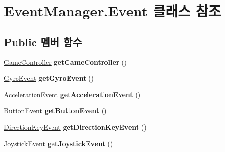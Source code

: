 \hypertarget{class_event_manager_1_1_event}{}\section{Event\+Manager.\+Event 클래스 참조}
\label{class_event_manager_1_1_event}
\subsection*{Public 멤버 함수}
\begin{DoxyCompactItemize}
\item 
\hypertarget{class_event_manager_1_1_event_a9d51b34eef1234efc07ee484d68747ef}{}\hyperlink{class_game_controller}{Game\+Controller} {\bfseries get\+Game\+Controller} ()\label{class_event_manager_1_1_event_a9d51b34eef1234efc07ee484d68747ef}

\item 
\hypertarget{class_event_manager_1_1_event_afbf072b1da0d9e1823b72358fac58737}{}\hyperlink{class_event_manager_1_1_gyro_event}{Gyro\+Event} {\bfseries get\+Gyro\+Event} ()\label{class_event_manager_1_1_event_afbf072b1da0d9e1823b72358fac58737}

\item 
\hypertarget{class_event_manager_1_1_event_ae298c4a24ed673ca9a97c7d254089e7d}{}\hyperlink{class_event_manager_1_1_acceleration_event}{Acceleration\+Event} {\bfseries get\+Acceleration\+Event} ()\label{class_event_manager_1_1_event_ae298c4a24ed673ca9a97c7d254089e7d}

\item 
\hypertarget{class_event_manager_1_1_event_ae41c50157988cb2e2fc03dfced1cdbb0}{}\hyperlink{class_event_manager_1_1_button_event}{Button\+Event} {\bfseries get\+Button\+Event} ()\label{class_event_manager_1_1_event_ae41c50157988cb2e2fc03dfced1cdbb0}

\item 
\hypertarget{class_event_manager_1_1_event_a5b2c2ccfd92ccad4c0637cfd9667867a}{}\hyperlink{class_event_manager_1_1_direction_key_event}{Direction\+Key\+Event} {\bfseries get\+Direction\+Key\+Event} ()\label{class_event_manager_1_1_event_a5b2c2ccfd92ccad4c0637cfd9667867a}

\item 
\hypertarget{class_event_manager_1_1_event_a591b60a8a46cbe09f3aed1d2a22f30c4}{}\hyperlink{class_event_manager_1_1_joystick_event}{Joystick\+Event} {\bfseries get\+Joystick\+Event} ()\label{class_event_manager_1_1_event_a591b60a8a46cbe09f3aed1d2a22f30c4}


\end{DoxyCompactItemize}
